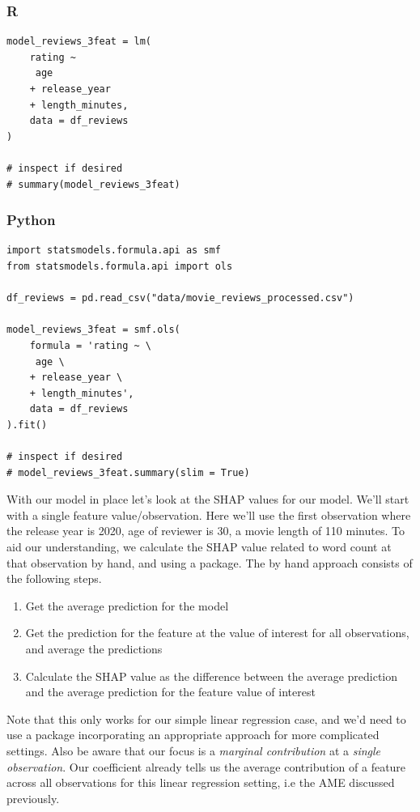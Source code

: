 \documentclass[
  letterpaper,
]{krantz}
\providecommand{\tightlist}{%
  \setlength{\itemsep}{0pt}\setlength{\parskip}{0pt}}\usepackage{longtable,booktabs,array}
\begin{document}
\subsubsection{R}

\begin{verbatim}
model_reviews_3feat = lm(
    rating ~
     age
    + release_year
    + length_minutes,
    data = df_reviews
)

# inspect if desired
# summary(model_reviews_3feat)
\end{verbatim}

\subsubsection{Python}

\begin{verbatim}
import statsmodels.formula.api as smf
from statsmodels.formula.api import ols

df_reviews = pd.read_csv("data/movie_reviews_processed.csv")

model_reviews_3feat = smf.ols(
    formula = 'rating ~ \
     age \
    + release_year \
    + length_minutes',
    data = df_reviews
).fit()

# inspect if desired
# model_reviews_3feat.summary(slim = True)
\end{verbatim}

With our model in place let's look at the SHAP values for our model.
We'll start with a single feature value/observation. Here we'll use the
first observation where the release year is 2020, age of reviewer is 30,
a movie length of 110 minutes. To aid our understanding, we calculate
the SHAP value related to word count at that observation by hand, and
using a package. The by hand approach consists of the following steps.

\begin{enumerate}
\def\labelenumi{\arabic{enumi}.}
\tightlist
\item
  Get the average prediction for the model
\item
  Get the prediction for the feature at the value of interest for all
  observations, and average the predictions
\item
  Calculate the SHAP value as the difference between the average
  prediction and the average prediction for the feature value of
  interest
\end{enumerate}

Note that this only works for our simple linear regression case, and
we'd need to use a package incorporating an appropriate approach for
more complicated settings. Also be aware that our focus is a
\emph{marginal contribution} at a \emph{single observation}. Our
coefficient already tells us the average contribution of a feature
across all observations for this linear regression setting, i.e the AME
discussed previously.
\end{document}
